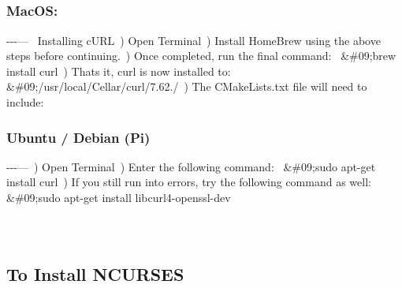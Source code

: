 \subparagraph*{}

\subsubsection*{Mac\+OS\+:}

-\/-\/-\/---~\newline
 Installing c\+U\+RL~) Open Terminal~) Install Home\+Brew using the above steps before continuing.~) Once completed, run the final command\+:~\newline
 \&\#09;brew install curl~) That\textquotesingle{}s it, curl is now installed to\+:~\newline
 \&\#09;/usr/local/\+Cellar/curl/7.62./~) The C\+Make\+Lists.\+txt file will need to include\+:~\newline


\subsubsection*{Ubuntu / Debian (Pi)}

-\/-\/-\/---~) Open Terminal~) Enter the following command\+:~\newline
 \&\#09;sudo apt-\/get install curl~) If you still run into errors, try the following command as well\+:~\newline
 \&\#09;sudo apt-\/get install libcurl4-\/openssl-\/dev~\newline


\subparagraph*{}

~\newline
\subsection*{To Install N\+C\+U\+R\+S\+ES}

